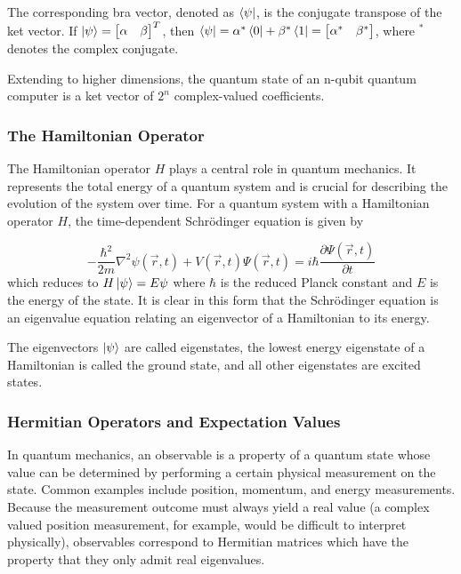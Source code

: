 The corresponding bra vector, denoted as $\bra{\psi}$, is the conjugate transpose of the ket vector. If $\ket{\psi} = \begin{bmatrix} \alpha & \beta \end{bmatrix}^T$, then $\bra{\psi} = \alpha^*\bra{0} + \beta^*\bra{1} = \begin{bmatrix} \alpha^* & \beta^* \end{bmatrix}$, where $^*$ denotes the complex conjugate.

Extending to higher dimensions, the quantum state of an n-qubit quantum computer is a ket vector of $2^n$ complex-valued coefficients.


\subsubsection{The Hamiltonian Operator}
The Hamiltonian operator $H$ plays a central role in quantum mechanics. It represents the total energy of a quantum system and is crucial for describing the evolution of the system over time. For a quantum system with a Hamiltonian operator $H$, the time-dependent Schrödinger equation is given by

\begin{equation*}
-\frac{\hbar^2}{2m} \nabla^2 \psi(\vec{r}, t) + V(\vec{r}, t) \Psi(\vec{r}, t) = i\hbar \frac{\partial \Psi(\vec{r}, t)}{\partial t}
\end{equation*}
which reduces to $H\ket{\psi} = E\psi$
where $\hbar$ is the reduced Planck constant and $E$ is the energy of the state.  It is clear in this form that the Schrödinger equation is an eigenvalue equation relating an eigenvector of a Hamiltonian to its energy.  

The eigenvectors $\ket{\psi}$ are called eigenstates, the lowest energy eigenstate of a Hamiltonian is called the ground state, and all other eigenstates are excited states.

\subsubsection{Hermitian Operators and Expectation Values}
In quantum mechanics, an observable is a property of a quantum state whose value can be determined by performing a certain physical measurement on the state.  Common examples include position, momentum, and energy measurements.  Because the measurement outcome must always yield a real value (a complex valued position measurement, for example, would be difficult to interpret physically), observables correspond to Hermitian matrices which have the property that they only admit real eigenvalues.

